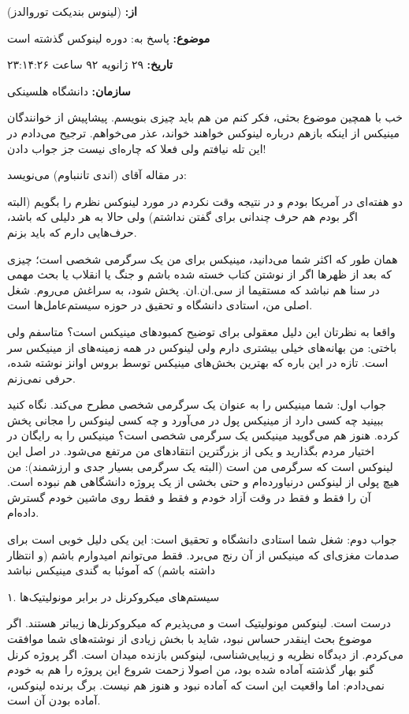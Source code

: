 \begin{emailbox}
\noindent\textbf{از:}  (لینوس بندیکت توروالدز)

\noindent\textbf{موضوع:} پاسخ به: دوره لینوکس گذشته است 

\noindent\textbf{تاریخ:} ۲۹ ژانویه ۹۲ ساعت ۲۳:۱۴:۲۶

\noindent\textbf{سازمان:} دانشگاه هلسینکی

خب با همچین موضوع بحثی، فکر کنم من هم باید چیزی بنویسم. پیشاپیش از
خوانندگان مینیکس از اینکه بازهم درباره لینوکس خواهند خواند، عذر
می‌خواهم. ترجیح می‌دادم در این تله نیافتم ولی فعلا که چاره‌ای نیست جز
جواب‌ دادن!

در مقاله  آقای  (اندی
تاننباوم) می‌نویسد:

دو هفته‌ای در آمریکا بودم و در نتیجه وقت نکردم در مورد لینوکس نظرم را
بگویم (البته اگر بودم هم حرف چندانی برای گفتن نداشتم) ولی حالا به هر
دلیلی که باشد، حرف‌هایی دارم که باید بزنم.

همان طور که اکثر شما می‌دانید، مینیکس برای من یک سرگرمی شخصی است؛ چیزی
که بعد از ظهرها اگر از نوشتن کتاب خسته شده باشم و جنگ یا انقلاب یا بحث
مهمی در سنا هم نباشد که مستقیما از سی.ان.ان. پخش شود، به سراغش
می‌روم. شغل اصلی من، استادی دانشگاه و تحقیق در حوزه سیستم‌عامل‌ها است.

واقعا به نظرتان این دلیل معقولی برای توضیح کمبودهای مینیکس است؟ متاسفم
ولی باختی: من بهانه‌های خیلی بیشتری دارم ولی لینوکس در همه زمینه‌های از
مینیکس سر است. تازه در این باره که بهترین بخش‌های مینیکس توسط بروس
اوانز نوشته شده، حرفی نمی‌زنم.

\noindent جواب اول: شما مینیکس را به عنوان یک سرگرمی شخصی مطرح
می‌کند. نگاه کنید ببینید چه کسی دارد از مینیکس پول در می‌آورد و چه کسی
لینوکس را مجانی پخش کرده. هنوز هم می‌گویید مینیکس یک سرگرمی شخصی است؟
مینیکس را به رایگان در اختیار مردم بگذارید و یکی از بزرگترین انتقاد‌های
من مرتفع می‌شود. در اصل این لینوکس است که سرگرمی من است (البته یک
سرگرمی بسیار جدی و ارزشمند): من هیچ پولی از لینوکس درنیاورده‌ام و حتی
بخشی از یک پروژه دانشگاهی هم نبوده است. آن را فقط و فقط در وقت آزاد
خودم و فقط و فقط روی ماشین خودم گسترش داده‌ام.

\noindent جواب دوم: شغل شما استادی دانشگاه و تحقیق است: این یکی دلیل
خوبی است برای صدمات مغزی‌ای که مینیکس از آن رنج می‌برد. فقط می‌توانم
امیدوارم باشم (و انتظار داشته باشم) که آموئبا به گندی مینیکس نباشد

\noindent ۱. سیستم‌های میکروکرنل در برابر مونولیتیک‌ها

درست است. لینوکس مونولیتیک است و می‌پذیرم که میکروکرنل‌ها زیباتر
هستند. اگر موضوع بحث اینقدر حساس نبود، شاید با بخش زیادی از نوشته‌های
شما موافقت می‌کردم. از دیدگاه نظریه و زیبایی‌شناسی، لینوکس بازنده میدان
است. اگر پروژه کرنل گنو بهار گذشته آماده شده بود، من اصولا زحمت شروع
این پروژه را هم به خودم نمی‌دادم: اما واقعیت این است که آماده نبود و
هنوز هم نیست. برگ برنده لینوکس، آماده بودن آن است.


\end{emailbox}

